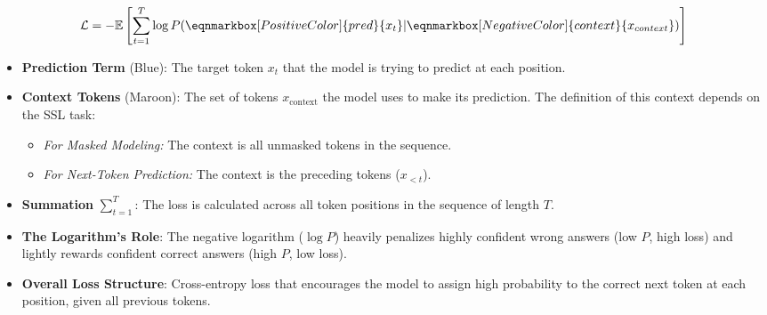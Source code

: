 \documentclass[11pt, oneside]{article}
\providecommand{\DIFaddbegin}{} %
\providecommand{\DIFaddend}{} %
\providecommand{\DIFdelbegin}{} %
\providecommand{\DIFdelend}{} %
\newcommand{\DIFscaledelfig}{0.5}
\newlength{\DIFdelgraphicswidth} %
\newlength{\DIFdelgraphicsheight} %
\newcommand{\DIFaddincludegraphics}[2][]{{\color{blue}\fbox{\DIFOincludegraphics[#1]{#2}}}} %
\newcommand{\DIFdelincludegraphics}[2][]{%
\sbox{\DIFdelgraphicsbox}{\DIFOincludegraphics[#1]{#2}}%
\settoboxwidth{\DIFdelgraphicswidth}{\DIFdelgraphicsbox} %
\settoboxtotalheight{\DIFdelgraphicsheight}{\DIFdelgraphicsbox} %
\scalebox{\DIFscaledelfig}{%
\parbox[b]{\DIFdelgraphicswidth}{\usebox{\DIFdelgraphicsbox}\\[-\baselineskip] \rule{\DIFdelgraphicswidth}{0em}}\llap{\resizebox{\DIFdelgraphicswidth}{\DIFdelgraphicsheight}{%
\setlength{\unitlength}{\DIFdelgraphicswidth}%
\begin{picture}(1,1)%
\thicklines\linethickness{2pt} %
{\color[rgb]{1,0,0}\put(0,0){\framebox(1,1){}}}%
{\color[rgb]{1,0,0}\put(0,0){\line( 1,1){1}}}%
{\color[rgb]{1,0,0}\put(0,1){\line(1,-1){1}}}%
\end{picture}%
}\hspace*{3pt}}} %
} %
\DeclareRobustCommand{\DIFaddbegin}{\DIFOaddbegin \let\includegraphics\DIFaddincludegraphics} %
\DeclareRobustCommand{\DIFaddend}{\DIFOaddend \let\includegraphics\DIFOincludegraphics} %
\DeclareRobustCommand{\DIFdelbegin}{\DIFOdelbegin \let\includegraphics\DIFdelincludegraphics} %
\DeclareRobustCommand{\DIFdelend}{\DIFOaddend \let\includegraphics\DIFOincludegraphics} %
\begin{document}
\begin{tcolorbox}[
    title= Cross-Entropy Loss,
    breakable,
    enhanced,
    colback=white,
    colframe=black!30,
    colbacktitle=black!10,
    coltitle=black,
    fonttitle=\bfseries,
    boxrule=0.5mm,
    left=2mm,
    right=2mm,
    top=4mm,
    bottom=4mm,
    middle=10mm
]
\label{eq:nexttoken}
\begin{center}
\begin{minipage}{0.9\linewidth}
\begin{equation}
\mathcal{L} = 
-\mathbb{E} \left[ \sum_{t=1}^{T} 
\log P(\eqnmarkbox[PositiveColor]{pred}{x_t} | \DIFdelbegin %
\DIFdelend \DIFaddbegin \eqnmarkbox[NegativeColor]{context}{x_{context}}\DIFaddend )
\right]
\label{eq:cross_entropy}
\end{equation}
\end{minipage}
\end{center}
\tcblower
\begin{itemize}
\item \textbf{Prediction Term} ({\color{PositiveColor}Blue}): The target token $x_t$ that the model is trying to predict at each position.
\item \textbf{Context Tokens} ({\color{NegativeColor}Maroon}): The set of tokens $x_{\text{context}}$ the model uses to make its prediction. The definition of this context depends on the SSL task:
            \begin{itemize}
                \item \textit{For Masked Modeling:} The context is all unmasked tokens in the sequence.
                \item \textit{For Next-Token Prediction:} The context is the preceding tokens ($x_{<t}$).     
            \end{itemize}
\item \textbf{Summation} $\sum_{t=1}^{T}$: The loss is calculated across all token positions in the sequence of length $T$.
\item \textbf{The Logarithm's Role}: The negative logarithm ($\log P$) heavily penalizes highly confident wrong answers (low $P$, high loss) and lightly rewards confident correct answers (high $P$, low loss).
\item \textbf{Overall Loss Structure}: Cross-entropy loss that encourages the model to assign high probability to the correct next token at each position, given all previous tokens.
\end{itemize}
\end{tcolorbox}
\end{document}
